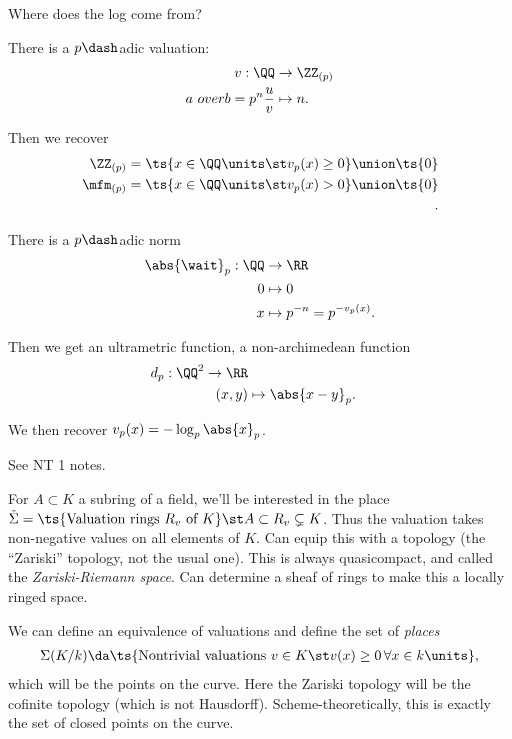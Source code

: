 \begin{example}

Where does the log come from?

There is a \(p\dash\)adic valuation:
\begin{align*}  
v: \QQ &\to \ZZ_{(p)} \\
{a\ over b} = p^n {u \over v} &\mapsto n
.\end{align*}

Then we recover
\begin{align*}  
\ZZ_{(p)} = \ts {x\in \QQ\units \st v_p(x) \geq 0} \union \ts{0} \\
\mfm_{(p)} = \ts {x\in \QQ\units \st v_p(x) > 0} \union \ts{0} \\
.\end{align*}

There is a \(p\dash\)adic norm
\begin{align*}  
\abs{\wait}_p: \QQ &\to \RR \\
0 & \mapsto 0 \\
x &\mapsto p^{-n} = p^{-v_p(x)}
.\end{align*}

Then we get an ultrametric function, a non-archimedean function
\begin{align*}  
d_p: \QQ^2 \to \RR \\
(x, y) &\mapsto \abs{x- y}_p
.\end{align*}

We then recover \(v_p(x) = -\log_p \abs{x}_p\).

See NT 1 notes.

\end{example}

For \(A\subset K\) a subring of a field, we'll be interested in the
place
\(\tilde \Sigma = \ts{\text{Valuation rings } R_v \text{ of } K} \st A \subset R_v \subsetneq K\).
Thus the valuation takes non-negative values on all elements of \(K\).
Can equip this with a topology (the ``Zariski'' topology, not the usual
one). This is always quasicompact, and called the \emph{Zariski-Riemann
space}. Can determine a sheaf of rings to make this a locally ringed
space.

We can define an equivalence of valuations and define the set of
\emph{places}
\begin{align*}  
\Sigma(K/k) \da \ts{\text{Nontrivial valuations } v\in K \st v(x) \geq 0\, \forall x\in k\units}
,\end{align*} which will be the points on the curve. Here the Zariski
topology will be the cofinite topology (which is not Hausdorff).
Scheme-theoretically, this is exactly the set of closed points on the
curve.

